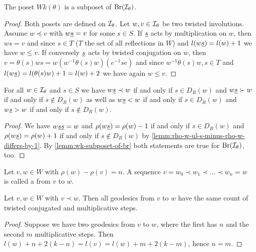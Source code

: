 \begin{lemm}
	The poset $Wk(\theta)$ is a subposet of $\operatorname{Br}(\mathcal{I}_{\theta})$.

	\begin{proof}
		Both posets are defined on $\mathcal{I}_{\theta}$. Let $w,v \in \mathcal{I}_{\theta}$ be two twisted involutions. Assume $w \preceq v$ with $w \underline{s} = v$ for some $s \in S$. If $\underline{s}$ acts by multiplication on $w$, then $ws = v$ and since $s \in T$ ($T$ the set of all reflections in $W$) and $l(w \underline{s}) = l(w) + 1$ we have $w \leq v$. If conversely $\underline{s}$ acts by twisted conjugation on $w$, then $v = \theta(s)ws = w (w^{-1} \theta(s) w)(e^{-1}se)$ and since $w^{-1} \theta(s) w, s \in T$ and $l(w \underline{s}) = l(\theta(s)w) + 1 = l(w) + 2$ we have again $w \leq v$.
	\end{proof}
\end{lemm}

\begin{prop}
	For all $w \in \mathcal{I}_{\theta}$ and $s \in S$ we have $w \underline{s} \prec w$ if and only if $s \in D_R(w)$ and $w \underline{s} \succ w$ if and only if $s \notin D_R(w)$ as well as $w \underline{s} < w$ if and only if $s \in D_R(w)$ and $w \underline{s} > w$ if and only if $s \notin D_R(w)$.

	\begin{proof}
		We have $w \underline{s} \underline{s} = w$ and $\rho(w \underline{s}) = \rho(w) - 1$ if and only if $s \in D_R(w)$ and $\rho(w \underline{s}) = \rho(w) + 1$ if and only if $s \notin D_R(w)$ by \ref{lemm:rho-w-ul-s-minus-rho-w-differs-by-1}. By \ref{lemm:wk-subposet-of-br} both statements are true for $\operatorname{Br}(\mathcal{I}_{\theta})$, too.
	\end{proof}
\end{prop}

\begin{defi}
	Let $v,w \in W$ with $\rho(w) - \rho(v) = n$. A sequence $v = w_0 \prec w_1 \prec \ldots \prec w_n = w$ is called a  from $v$ to $w$.
\end{defi}

\begin{prop}
	Let $v,w \in W$ with $v \prec w$. Then all geodesics from $v$ to $w$ have the same count of twisted conjugated and multiplicative steps.

	\begin{proof}
		Suppose we have two geodesics from $v$ to $w$, where the first has $n$ and the second $m$ multiplicative steps. Then $l(w) + n + 2(k-n) = l(v) = l(w) + m + 2(k-m)$, hence $n = m$.
	\end{proof}
\end{prop}

